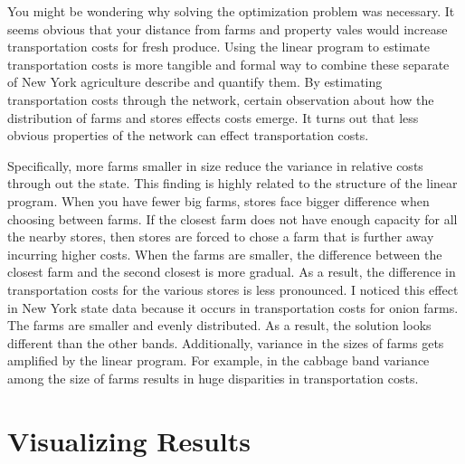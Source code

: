 \documentclass{report}
\begin{document}
You might be wondering why solving the optimization problem was necessary. It seems obvious that your distance from farms and property vales would increase transportation costs for fresh produce. Using the linear program to estimate transportation costs is more tangible and formal way to combine these separate of New York agriculture describe and quantify them. By estimating transportation costs through the network, certain observation about how the distribution of farms and stores effects costs emerge. It turns out that less obvious properties of the network can effect transportation costs. 

Specifically, more farms smaller in size reduce the variance in relative costs through out the state. This finding is highly related to the structure of the linear program. When you have fewer big farms, stores face bigger difference when choosing between farms. If the closest farm does not have enough capacity for all the nearby stores, then stores are forced to chose a farm that is further away incurring higher costs. When the farms are smaller, the difference between the closest farm and the second closest is more gradual. As a result, the difference in transportation costs for the various stores is less pronounced. I noticed this effect in New York state data because it occurs in  transportation costs for onion farms. The farms are smaller and evenly distributed. As a result, the solution looks different than the other bands. Additionally, variance in the sizes of farms gets amplified by the linear program. For example, in the cabbage band variance among the size of farms results in huge disparities in transportation costs.

\section{Visualizing Results}
\end{document}
